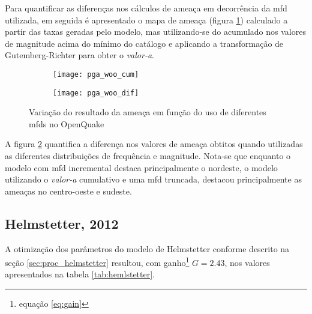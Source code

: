 Para quantificar as diferenças nos cálculos de ameaça em decorrência da \gls{mfd} utilizada, em seguida é apresentado o
mapa de ameaça (figura \ref{fig:pga_woo_cum}) calculado a partir das taxas geradas pelo modelo, mas utilizando-se do
acumulado nos valores de magnitude acima do mínimo do catálogo e aplicando a transformação de Gutemberg-Richter 
para obter o \emph{valor-a}.
\begin{figure}[H]
	\centering
	\begin{subfigure}[t]{0.47\textwidth}
		\centering
		\texttt{[image: pga\_woo\_cum]} 
		\label{fig:pga_woo_cum} 
	\end{subfigure}
	\quad
	\begin{subfigure}[t]{0.47\textwidth}
		\centering
		\texttt{[image: pga\_woo\_dif]} 
		\label{fig:pga_woo_dif} 
	\end{subfigure}
	\caption{Variação do resultado da ameaça em função do uso de diferentes 
			\glspl{mfd} no OpenQuake}
	\label{fig:pga_woo} 
\end{figure}

A figura \ref{fig:pga_woo_dif} quantifica a diferença nos valores de ameaça obtitos quando 
utilizadas as diferentes distribuições de frequência e magnitude. Nota-se que enquanto
o modelo com \gls{mfd} incremental destaca principalmente o nordeste, o modelo utilizando o \emph{valor-a}
cumulativo e uma \gls{mfd} truncada, destacou principalmente as ameaças no centro-oeste e sudeste.


\subsection{Helmstetter, 2012}
\label{sec:helmstetter_resultados}

A otimização dos parâmetros do modelo de Helmstetter conforme descrito na seção \ref{sec:proc_helmstetter}
resultou, com ganho\footnote{equação \eqref{eq:gain}} $G = 2.43$, nos valores apresentados na tabela
\ref{tab:hemlstetter}.

